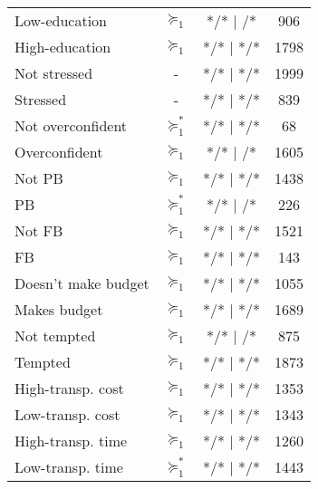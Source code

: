 \begin{tabular}{lccc}
Low-education & \cellcolor[rgb]{ .851,  .882,  .949} $\succeq_{1}$ & */*  |     /* & 906 \\
High-education & \cellcolor[rgb]{ .851,  .882,  .949} $\succeq_{1}$ & */*  |  */* & 1798 \\
Not stressed & -     & */*  |  */* & 1999 \\
Stressed & -     & */*  |  */* & 839 \\
Not overconfident & \cellcolor[rgb]{ .557,  .663,  .859} $\succeq_{1}^*$ & */*  |  */* & 68 \\
Overconfident & \cellcolor[rgb]{ .851,  .882,  .949} $\succeq_{1}$ & */*  |     /* & 1605 \\
Not PB & \cellcolor[rgb]{ .851,  .882,  .949} $\succeq_{1}$ & */*  |  */* & 1438 \\
PB    & \cellcolor[rgb]{ .557,  .663,  .859} $\succeq_{1}^*$ & */*  |     /* & 226 \\
Not FB & \cellcolor[rgb]{ .851,  .882,  .949} $\succeq_{1}$ & */*  |  */* & 1521 \\
FB    & \cellcolor[rgb]{ .851,  .882,  .949} $\succeq_{1}$ & */*  |  */* & 143 \\
Doesn't make budget & \cellcolor[rgb]{ .851,  .882,  .949} $\succeq_{1}$ & */*  |  */* & 1055 \\
Makes budget & \cellcolor[rgb]{ .851,  .882,  .949} $\succeq_{1}$ & */*  |  */* & 1689 \\
Not tempted & \cellcolor[rgb]{ .851,  .882,  .949} $\succeq_{1}$ & */*  |     /* & 875 \\
Tempted & \cellcolor[rgb]{ .851,  .882,  .949} $\succeq_{1}$ & */*  |  */* & 1873 \\
High-transp. cost & \cellcolor[rgb]{ .851,  .882,  .949} $\succeq_{1}$ & */*  |  */* & 1353 \\
Low-transp. cost & \cellcolor[rgb]{ .851,  .882,  .949} $\succeq_{1}$ & */*  |  */* & 1343 \\
High-transp. time & \cellcolor[rgb]{ .851,  .882,  .949} $\succeq_{1}$ & */*  |  */* & 1260 \\
Low-transp. time & \cellcolor[rgb]{ .557,  .663,  .859} $\succeq_{1}^*$ & */*  |  */* & 1443 \\
\bottomrule
\bottomrule
\end{tabular}%
